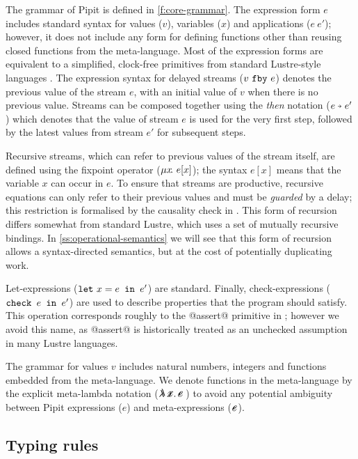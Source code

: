 \documentclass[sigplan,screen]{acmart}
\begin{document}




The grammar of Pipit is defined in \autoref{f:core-grammar}.
The expression form $e$ includes standard syntax for values ($v$), variables ($x$) and applications ($e~e'$); however, it does not include any form for defining functions other than reusing closed functions from the \fstar{} meta-language.
Most of the expression forms are equivalent to a simplified, clock-free primitives from standard Lustre-style languages \cite{caspi1995functional}.
The expression syntax for delayed streams ($v~\texttt{fby}~e$) denotes the previous value of the stream $e$, with an initial value of $v$ when there is no previous value.
Streams can be composed together using the \emph{then} notation ($\xthen{e}{e'}$) which denotes that the value of stream $e$ is used for the very first step, followed by the latest values from stream $e'$ for subsequent steps.

Recursive streams, which can refer to previous values of the stream itself, are defined using the fixpoint operator ($\mu{} x \!.~e[x]$); the syntax $e[x]$ means that the variable $x$ can occur in $e$.
To ensure that streams are productive, recursive equations can only refer to their previous values and must be \emph{guarded} by a delay; this restriction is formalised by the causality check in \REF{}.
This form of recursion differs somewhat from standard Lustre, which uses a set of mutually recursive bindings.
In \autoref{ss:operational-semantics} we will see that this form of recursion allows a syntax-directed semantics, but at the cost of potentially duplicating work.

Let-expressions ($\texttt{let}~x = e \texttt{~in~} e'$) are standard.
Finally, check-expressions ($\texttt{check~} e \texttt{~in~} e'$) are used to describe properties that the program should satisfy.
This operation corresponds roughly to the @assert@ primitive in \fstar{}; however we avoid this name, as @assert@ is historically treated as an unchecked assumption in many Lustre languages.

The grammar for values $v$ includes natural numbers, integers and functions embedded from the \fstar{} meta-language.
We denote functions in the meta-language by the explicit meta-lambda notation ($\mlamX{}$) to avoid any potential ambiguity between Pipit expressions ($e$) and meta-expressions ($\metafy{e}$).

\subsection{Typing rules}
\label{ss:typing-rules}
\end{document}
